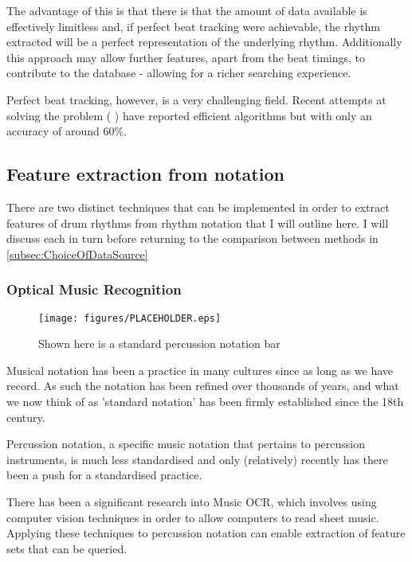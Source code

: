 \documentclass[12pt,twoside,notitlepage]{report}
\begin{document}
		The advantage of this is that there is that the amount of data available is effectively limitless and, if perfect beat tracking were achievable, the rhythm extracted will be a perfect representation of the underlying rhythm. Additionally this approach may allow further features, apart from the beat timings, to contribute to the database - allowing for a richer searching experience.
		
		Perfect beat tracking, however, is a very challenging field. Recent attempts at solving the problem (\cite{Ellis2007} \cite{EllisPoliner2007} \cite{DaviesPlumbley2007}) have reported efficient algorithms but with only an accuracy of around 60\%.
		\subsection{Feature extraction from notation}
		There are two distinct techniques that can be implemented in order to extract features of drum rhythms from rhythm notation that I will outline here. I will discuss each in turn before returning to the comparison between methods in \ref{subsec:ChoiceOfDataSource}
			\subsubsection{Optical Music Recognition}
			\begin{figure}[h]
			\centerline{\texttt{[image: figures/PLACEHOLDER.eps]}}
			\caption{\label{PercussionNotation} Shown here is a standard percussion notation bar}
\end{figure}
		Musical notation has been a practice in many cultures since as long as we have record\cite{Scelta}. As such the notation has been refined over thousands of years, and what we now think of as 'standard notation' has been firmly established since the 18th century\cite{Scelta}.
		
		Percussion notation, a specific music notation that pertains to percussion instruments, is much less standardised and only (relatively) recently has there been a push for a standardised practice\cite{Weinberg1994}. 
		
		There has been a significant research\cite{Johansen2009}\cite{BainbridgeBell2001} into Music OCR\footnotemark {}, which involves using computer vision techniques in order to allow computers to read sheet music. Applying these techniques to percussion notation can enable extraction of feature sets that can be queried.
		
\end{document}
